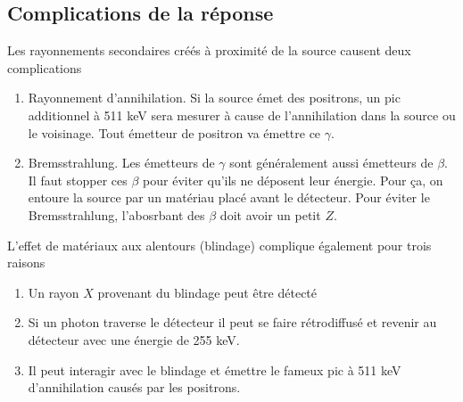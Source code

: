 \subsection{Complications de la réponse}
Les rayonnements secondaires créés à proximité de la source causent deux complications
\begin{enumerate}
\item Rayonnement d'annihilation. Si la source émet des positrons, un pic additionnel à 
511 keV sera mesurer à cause de l'annihilation dans la source ou le voisinage. Tout émetteur de
positron va émettre ce $\gamma$.
\item Bremsstrahlung. Les émetteurs de $\gamma$ sont généralement aussi émetteurs de $\beta$. Il 
faut stopper ces $\beta$ pour éviter qu'ils ne déposent leur énergie. Pour ça, on entoure la source
par un matériau placé avant le détecteur. Pour éviter le Bremsstrahlung, l'abosrbant des $\beta$
doit avoir un petit $Z$.
\end{enumerate}


L'effet de matériaux aux alentours (blindage) complique également pour trois raisons
\begin{enumerate}
\item Un rayon $X$ provenant du blindage peut être détecté
\item Si un photon traverse le détecteur il peut se faire rétrodiffusé et revenir au détecteur avec une énergie de 255 keV.
\item Il peut interagir avec le blindage et émettre le fameux pic à 511 keV d'annihilation causés par les positrons.
\end{enumerate}















